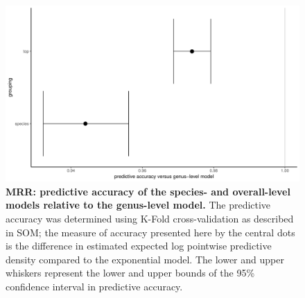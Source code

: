 \documentclass[12pt]{article}
\begin{document}
\begin{figure}[h]
	\centerline{\includegraphics[width=1\textwidth]{./Figure_files/mrr_genus_vs_species_vs_top.pdf}}
	\caption{\textbf{MRR: predictive accuracy of the species- and overall-level models relative to the genus-level model.} The predictive accuracy was determined using K-Fold cross-validation as described in SOM; the measure of accuracy presented here by the central dots is the difference in estimated expected log pointwise predictive density compared to the exponential model. The lower and upper whiskers represent the lower and upper bounds of the 95\% confidence interval in predictive accuracy.}
	\label{fig:mrr_genusTopLevel}
\end{figure}
\end{document}
